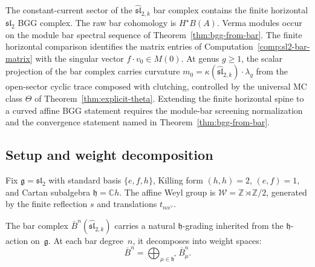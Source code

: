 The constant-current sector of the
$\widehat{\mathfrak{sl}}_{2,k}$ bar complex contains the finite
horizontal $\mathfrak{sl}_2$ BGG complex. The raw bar cohomology is
$H^\star B(A)$. Verma modules occur on the module bar spectral sequence of
Theorem~\ref{thm:bgg-from-bar}. The finite horizontal comparison
identifies the matrix entries of
Computation~\ref{comp:sl2-bar-matrix} with the singular vector
$f\cdot v_0\in M(0)$.
At genus $g \geq 1$, the scalar projection of the bar complex carries
curvature
$m_0 = \kappa(\widehat{\mathfrak{sl}}_{2,k}) \cdot \lambda_g$
from the open-sector cyclic trace composed with clutching,
controlled by the universal MC class $\Theta$ of
Theorem~\ref{thm:explicit-theta}. Extending the finite horizontal
spine to a curved affine BGG statement requires the module-bar
screening normalization and the convergence statement named in
Theorem~\ref{thm:bgg-from-bar}.

\subsection{Setup and weight decomposition}

Fix $\mathfrak{g} = \mathfrak{sl}_2$ with standard basis
$\{e, f, h\}$, Killing form $(h,h) = 2$, $(e,f) = 1$, and Cartan
subalgebra $\mathfrak{h} = \mathbb{C} h$. The affine Weyl group is
$\mathcal{W} = \mathbb{Z} \rtimes \mathbb{Z}/2$, generated by the
finite reflection $s$ and translations $t_{n\alpha^\vee}$.

The bar complex $\bar{B}^n(\widehat{\mathfrak{sl}}_{2,k})$ carries a
natural $\mathfrak{h}$-grading inherited from the $\mathfrak{h}$-action
on~$\mathfrak{g}$. At each bar degree~$n$, it decomposes into weight
spaces:
\begin{equation}\label{eq:bar-weight-decomposition}
\bar{B}^n = \bigoplus_{\mu \in \mathfrak{h}^*} \bar{B}^n_\mu.
\end{equation}

